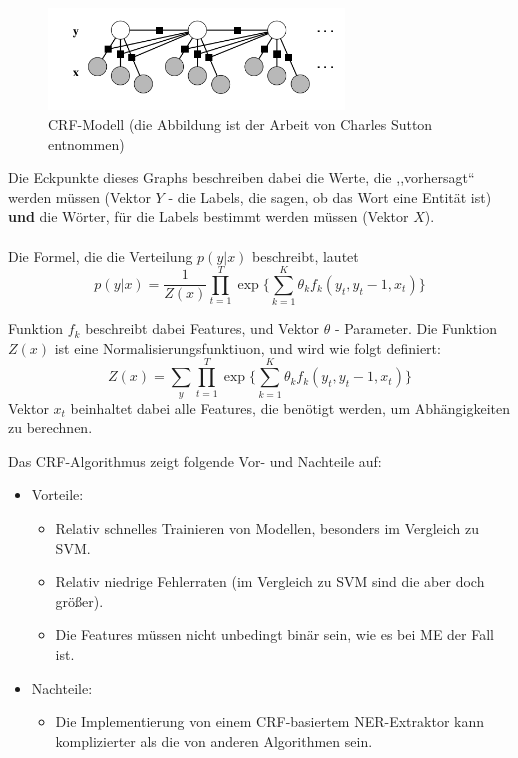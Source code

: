 \begin{figure}[ht]
\vbox{\small}
\includegraphics[width=0.7\textwidth]{Bilder/crf-modell-charles-andrew}
\caption{CRF-Modell (die Abbildung ist der Arbeit von Charles Sutton \cite{Charles/Andrew:10} entnommen)}
\label{fig:CRF-Modell}
\end{figure}
Die Eckpunkte dieses Graphs beschreiben dabei die Werte, die ,,vorhersagt`` werden müssen (Vektor $Y$ - die Labels, die sagen, ob das Wort eine Entität ist) \textbf{und} die Wörter, für die Labels bestimmt werden müssen (Vektor $X$)\cite{lafferty2001conditional}.

\paragraph{}
Die Formel, die die Verteilung $p(y|x)$ beschreibt, lautet 
$$
p(y|x) = \frac{1}{Z(x)}\prod_{t=1}^T\exp \lbrace \sum_{k=1}^K \theta_k f_k(y_t,y_t-1,x_t) \rbrace
$$  

Funktion $f_k$ beschreibt dabei Features, und Vektor $\theta$ - Parameter. Die Funktion $Z(x)$ ist eine Normalisierungsfunktiuon, und wird wie folgt definiert:
$$
Z(x) = \sum_y \prod_{t=1}^T\exp \lbrace \sum_{k=1}^K \theta_k f_k(y_t,y_t-1,x_t) \rbrace
$$
Vektor $x_t$ beinhaltet dabei alle Features, die benötigt werden, um Abhängigkeiten zu berechnen. 

Das CRF-Algorithmus zeigt folgende Vor- und Nachteile auf:
\begin{itemize}
\item Vorteile:
\begin{itemize}
\item Relativ schnelles Trainieren von Modellen\cite{sha2003shallow}, besonders im Vergleich zu SVM.
\item Relativ niedrige Fehlerraten (im Vergleich zu SVM sind die aber doch größer).
\item Die Features müssen nicht unbedingt binär sein, wie es bei ME der Fall ist.
\end{itemize}
\item Nachteile:
\begin{itemize}
\item Die Implementierung von einem CRF-basiertem NER-Extraktor kann komplizierter als die von anderen Algorithmen sein.
\end{itemize}
\end{itemize}

